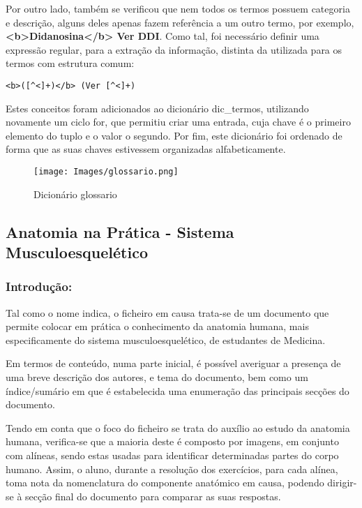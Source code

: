 Por outro lado, também se verificou que nem todos os termos possuem categoria e descrição, alguns deles apenas fazem referência a um outro termo, por exemplo, \textbf{<b>Didanosina</b> Ver DDI}. Como tal, foi necessário definir uma expressão regular, para a extração da informação, distinta da utilizada para os termos com estrutura comum:
\begin{lstlisting}[style=pythonstyle]
<b>([^<]+)</b> (Ver [^<]+)
\end{lstlisting}

Estes conceitos foram adicionados ao dicionário dic\_termos, utilizando novamente um ciclo for, que permitiu criar uma entrada, cuja chave é o primeiro elemento do tuplo e o valor o segundo. Por fim, este dicionário foi ordenado de forma que as suas chaves estivessem organizadas alfabeticamente.

\begin{figure}[H]
    \centering
    \centering
    \texttt{[image: Images/glossario.png]}
    \caption{Dicionário glossario}
    \label{fig:exemplopag}
\end{figure}

\subsection{Anatomia na Prática - Sistema Musculoesquelético}

\subsubsection{Introdução:}

Tal como o nome indica, o ficheiro em causa trata-se de um documento que permite colocar em prática o conhecimento da anatomia humana, mais especificamente do sistema musculoesquelético, de estudantes de Medicina.

Em termos de conteúdo, numa parte inicial, é possível averiguar a presença de uma breve descrição dos autores, e tema do documento, bem como um índice/sumário em que é estabelecida uma enumeração das principais secções do documento.

Tendo em conta que o foco do ficheiro se trata do auxílio ao estudo da anatomia humana, verifica-se que a maioria deste é composto por imagens, em conjunto com alíneas, sendo estas usadas para identificar determinadas partes do corpo humano.
Assim, o aluno, durante a resolução dos exercícios, para cada alínea, toma nota da nomenclatura do componente anatómico em causa, podendo dirigir-se à secção final do documento para comparar as suas respostas.


